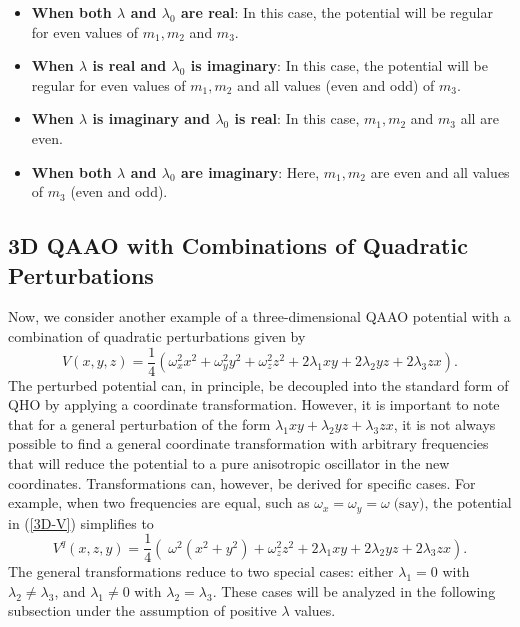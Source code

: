 \documentclass[a4paper, 12pt]{article}
\begin{document}
\begin{itemize}
\item {{\bf When both $\lambda$ and $\lambda_0$ are real}: 
In this case, the potential will be regular for even values of $m_1,m_2$ and $m_3$.}

\item{{\bf When $\lambda$ is real and $\lambda_0$ is imaginary}:
In this case, the potential will be regular for even values of $m_1,m_2$ and all values (even and odd) of $m_3$.}
\item{{\bf When $\lambda$ is imaginary and $\lambda_0$ is real}:
	In this case,  $m_1,m_2$ and $m_3$ all are even.}
\item{{\bf When both $\lambda$ and $\lambda_0$ are imaginary}:
	Here, $m_1,m_2$ are even and all values of $m_3$ (even and odd).}	
\end{itemize}



\subsection{3D QAAO with Combinations of Quadratic Perturbations}
Now, we consider another example of a three-dimensional QAAO potential with a combination of quadratic perturbations given by
\begin{equation}
V(x,y,z) = \frac{1}{4}\left(\omega_x^2x^2 + \omega_y^2y^2 + \omega_z^2z^2 + 2\lambda_1 xy + 2\lambda_2 yz + 2\lambda_3 zx\right). \label{3D-V}
\end{equation}
The perturbed potential can, in principle, be decoupled into the standard form of QHO by applying a coordinate transformation. However, it is important to note that for a general perturbation of the form \(\lambda_1 xy + \lambda_2 yz + \lambda_3 zx\), it is not always possible to find a general coordinate transformation with arbitrary frequencies that will reduce the potential to a pure anisotropic oscillator in the new coordinates. Transformations can, however, be derived for specific cases. 
For example, when two frequencies are equal, such as \(\omega_x = \omega_y=\omega\;\text{(say)}\), the potential in (\ref{3D-V}) simplifies to
\begin{equation}
V^{q}(x,z,y) = \frac{1}{4}\left(\;\omega^2(x^2 + y^2) + \omega_z^2z^2 + 2\lambda_1 xy + 2\lambda_2 yz + 2\lambda_3 zx\right). \label{special-3D}
\end{equation}
The general transformations reduce to two special cases: either \(\lambda_1 = 0\) with \(\lambda_2\ne\lambda_3\), and \(\lambda_1 \neq 0\) with \(\lambda_2 = \lambda_3\). These cases will be analyzed in the following subsection under the assumption of positive \(\lambda\) values. 
\end{document}

